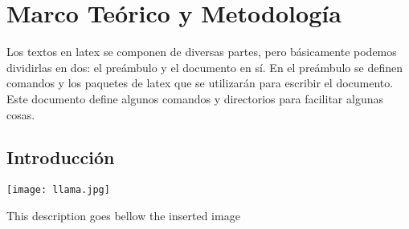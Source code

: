 
\chapter{Marco Teórico y Metodología}
\label{chap:MarcoTeorico}
Los textos en latex se componen de diversas partes, pero básicamente podemos dividirlas en dos: el preámbulo y el documento en sí. En el preámbulo se definen comandos y los paquetes de latex que se utilizarán para escribir el documento. Este documento define algunos comandos y directorios para facilitar algunas cosas.

\section{Introducción}
\label{sec:introduction}

\begin{figuraenv}
\texttt{[image: llama.jpg]}
\caption[This label goes to the TOC]{This description goes bellow the inserted image}\label{label to reference the image into text}
\end{figuraenv}

